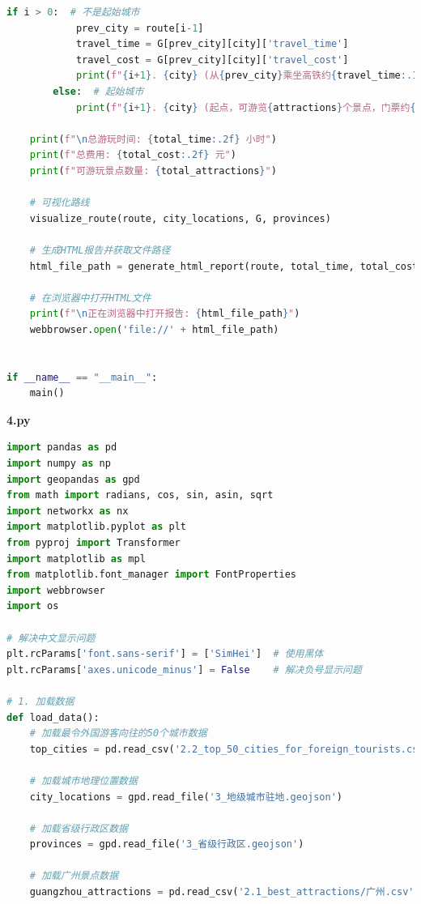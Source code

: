 \documentclass[withoutpreface,bwprint]{cumcmthesis} %
\begin{document}
\begin{appendices}
\begin{lstlisting}[language=python]
        if i > 0:  # 不是起始城市
            prev_city = route[i-1]
            travel_time = G[prev_city][city]['travel_time']
            travel_cost = G[prev_city][city]['travel_cost']
            print(f"{i+1}. {city} (从{prev_city}乘坐高铁约{travel_time:.1f}小时，费用{travel_cost:.0f}元，可游览{attractions}个景点，门票约{ticket_price:.0f}元)")
        else:  # 起始城市
            print(f"{i+1}. {city} (起点，可游览{attractions}个景点，门票约{ticket_price:.0f}元)")
    
    print(f"\n总游玩时间: {total_time:.2f} 小时")
    print(f"总费用: {total_cost:.2f} 元")
    print(f"可游玩景点数量: {total_attractions}")
    
    # 可视化路线
    visualize_route(route, city_locations, G, provinces)
    
    # 生成HTML报告并获取文件路径
    html_file_path = generate_html_report(route, total_time, total_cost, total_attractions, G, top_cities, guangzhou_attractions)
    
    # 在浏览器中打开HTML文件
    print(f"\n正在浏览器中打开报告: {html_file_path}")
    webbrowser.open('file://' + html_file_path)


if __name__ == "__main__":
    main()

 \end{lstlisting}







 \textbf{4.py}
\begin{lstlisting}[language=python]
import pandas as pd
import numpy as np
import geopandas as gpd
from math import radians, cos, sin, asin, sqrt
import networkx as nx
import matplotlib.pyplot as plt
from pyproj import Transformer
import matplotlib as mpl
from matplotlib.font_manager import FontProperties
import webbrowser
import os

# 解决中文显示问题
plt.rcParams['font.sans-serif'] = ['SimHei']  # 使用黑体
plt.rcParams['axes.unicode_minus'] = False    # 解决负号显示问题

# 1. 加载数据
def load_data():
    # 加载最令外国游客向往的50个城市数据
    top_cities = pd.read_csv('2.2_top_50_cities_for_foreign_tourists.csv')
    
    # 加载城市地理位置数据
    city_locations = gpd.read_file('3_地级城市驻地.geojson')
    
    # 加载省级行政区数据
    provinces = gpd.read_file('3_省级行政区.geojson')
    
    # 加载广州景点数据
    guangzhou_attractions = pd.read_csv('2.1_best_attractions/广州.csv')
    

\end{lstlisting}
\end{appendices}
\end{document}
